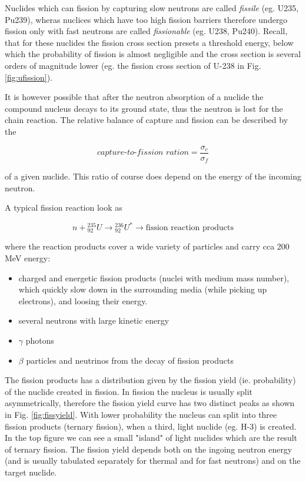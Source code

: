 Nuclides which can fission by capturing slow neutrons are called \textit{fissile} (eg. U235, Pu239), wheras nuclices which have too high fission barriers therefore undergo fission only with fast neutrons are called \textit{fissionable} (eg. U238, Pu240). Recall, that for these nuclides the fission cross section presets a threshold energy, below which the probability of fission is almost negligible and the cross section is several orders of magnitude lower (eg. the fission cross section of U-238 in Fig. \ref{fig:ufission}).

It is however possible that after the neutron absorption of a nuclide the compound nucleus decays to its ground state, thus the neutron is lost for the chain reaction. The relative balance of capture and fission can be described by the 

\begin{equation}
\textit{capture-to-fission ration}=\frac{\sigma_c}{\sigma_f}
\end{equation}

of a given nuclide. This ratio of course does depend on the energy of the incoming neutron.

A typical fission reaction look as 

\[
n+{}_{92}^{235}U\rightarrow {}_{92}^{236}U^* \rightarrow \text{fission reaction products}
\]

where the reaction products cover a wide variety of particles and carry cca 200 MeV energy:

\begin{itemize}
\item charged and energetic fission products (nuclei with medium mass number), which quickly slow down in the surrounding media (while picking up electrons), and loosing their energy.
\item several neutrons with large kinetic energy
\item $\gamma$ photons
\item $\beta$ particles and neutrinos from the decay of fission products
\end{itemize}

The fission products has a distribution given by the fission yield (ie. probability) of the nuclide created in fission. In fission the nucleus is usually split asymmetrically, therefore the fission yield curve has two distinct peaks as shown in Fig. \ref{fig:fissyield}. With lower probability the nucleus can split into three fission products (ternary fission), when a third, light nuclide (eg. H-3) is created. In the top figure we can see a small "island" of light nuclides which are the result of ternary fission. The fission yield depends both on the ingoing neutron energy (and is usually tabulated separately for thermal and for fast neutrons) and on the target nuclide.

